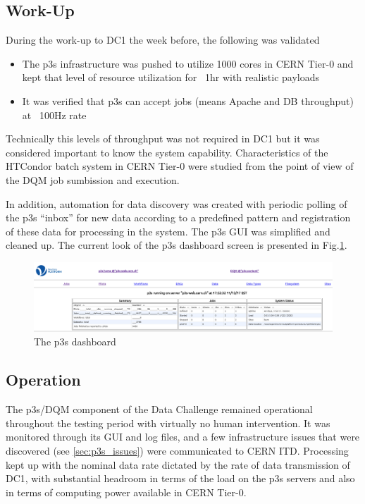 \documentclass[pdftex,12pt,letter]{article}
\begin{document}
\subsection{Work-Up}

During the work-up to DC1 the week before, the following was validated
\begin{itemize}

\item The p3s infrastructure was pushed to utilize 1000 cores in CERN Tier-0 and kept that level of resource utilization for ~1hr
with realistic payloads
\item It was verified that p3s can accept jobs (means Apache and DB throughput) at ~100Hz rate

\end{itemize}
\noindent Technically this levels of throughput was not required in DC1 but it was considered important to know the system capability.
Characteristics of the HTCondor batch system in CERN Tier-0 were studied from the point of view of the DQM job sumbission and
execution.

In addition, automation for data discovery was created with periodic polling of the p3s ``inbox'' for new data according to a predefined pattern
and registration of these data for processing in the system. The p3s GUI was simplified and cleaned up. The current look of the p3s
dashboard screen is presented in Fig.\ref{fig:p3s_dash}.
\begin{figure}[tbh]
  \centering
  \includegraphics[width=1.0\textwidth]{./ReportImages/p3s_20171113_1.png}
  \caption{The p3s dashboard}
  \label{fig:p3s_dash}
\end{figure}

\subsection{Operation}
The p3s/DQM component of the Data Challenge remained operational throughout the testing period with virtually no human intervention.
It was monitored through its GUI and log files, and a few infrastructure issues that were discovered (see \ref{sec:p3s_issues}) were communicated
to CERN ITD. Processing kept up with the nominal data rate dictated by the rate of data transmission of DC1, with substantial headroom in
terms of the load on the p3s servers and also in terms of computing power available in CERN Tier-0.
\end{document}
